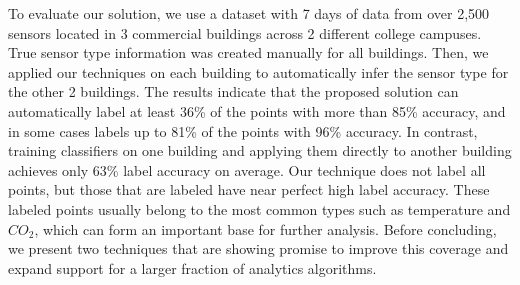 To evaluate our solution, we use a dataset with 7 days of data from over 2,500
sensors located in 3 commercial buildings across 2 different college campuses.
True sensor type information was created manually for all buildings. Then, we
applied our techniques on each building to automatically infer the sensor type
for the other 2 buildings. The results indicate that the proposed solution can
automatically label at least 36\% of the points with more than 85\% accuracy,
and in some cases labels up to 81\% of the points with 96\% accuracy. In
contrast, training classifiers on one building and applying them directly to
another building  achieves only 63\% label accuracy on average. Our technique
does not label all points, but those that are labeled have near perfect high
label accuracy. These labeled points usually belong to the most common types such
as temperature and $CO_2$, which can form an important base for further
analysis.  Before concluding, we present two techniques that are showing promise
to improve this coverage and expand support for a larger fraction of analytics
algorithms.

